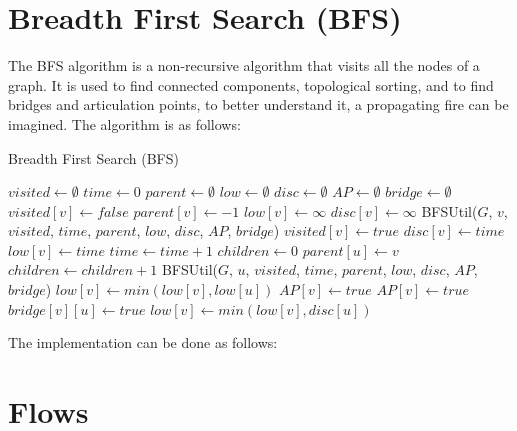 \section{Breadth First Search (BFS)}

The BFS algorithm is a non-recursive algorithm that visits all the nodes of a graph. It is used to find connected components, topological sorting, and to find bridges and articulation points, to better understand it, a propagating fire can be imagined. The algorithm is as follows:

\begin{algorithm}
\caption{Breadth First Search (BFS)}
\label{alg:bfs}
\begin{algorithmic}[1]
\State $visited \gets \emptyset$
\State $time \gets 0$
\State $parent \gets \emptyset$
\State $low \gets \emptyset$
\State $disc \gets \emptyset$
\State $AP \gets \emptyset$
\State $bridge \gets \emptyset$
\State $visited[v] \gets false$
\State $parent[v] \gets -1$
\State $low[v] \gets \infty$
\State $disc[v] \gets \infty$
\EndFor
{}
\State BFSUtil($G$, $v$, $visited$, $time$, $parent$, $low$, $disc$, $AP$, $bridge$)
\EndIf
\EndFor
\EndProcedure
{}
\State $visited[v] \gets true$
\State $disc[v] \gets time$
\State $low[v] \gets time$
\State $time \gets time + 1$
\State $children \gets 0$
\State $parent[u] \gets v$
\State $children \gets children + 1$
\State BFSUtil($G$, $u$, $visited$, $time$, $parent$, $low$, $disc$, $AP$, $bridge$)
\State $low[v] \gets min(low[v], low[u])$
\State $AP[v] \gets true$
\EndIf
{}
\State $AP[v] \gets true$
\EndIf
{}
\State $bridge[v][u] \gets true$
\EndIf
\Else
\State $low[v] \gets min(low[v], disc[u])$
\EndIf
\EndFor
\EndProcedure
\end{algorithmic}
\end{algorithm}

The implementation can be done as follows:





\section{Flows}

